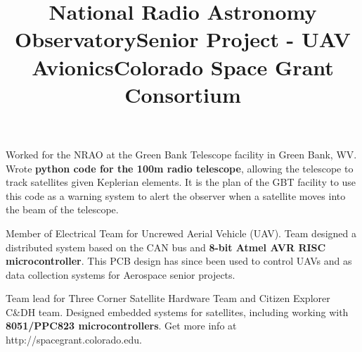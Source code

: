 \begin{resume}
\title{\bf National Radio Astronomy Observatory}
\begin{position}
Worked for the NRAO at the Green Bank Telescope facility in Green Bank, WV. Wrote {\bf python code for the 100m radio telescope}, allowing the telescope to track satellites given Keplerian elements. It is the plan of the GBT facility to use this code as a warning system to alert the observer when a satellite moves into the beam of the telescope. 
\end{position}

\title{\bf Senior Project - UAV Avionics}
\begin{position}
Member of Electrical Team for Uncrewed Aerial Vehicle (UAV). Team designed a
distributed system based on the CAN bus and {\bf 8-bit Atmel AVR RISC microcontroller}. This PCB design has since been used to control UAVs and as data collection systems for Aerospace senior projects. 
\end{position}

\title{\bf Colorado Space Grant Consortium}
\begin{position}
Team lead for Three Corner Satellite Hardware Team and Citizen Explorer C\&DH
team. Designed embedded systems for satellites, including working with {\bf 8051/PPC823 microcontrollers}. Get more info at http://spacegrant.colorado.edu.
\end{position}




\end{resume}
